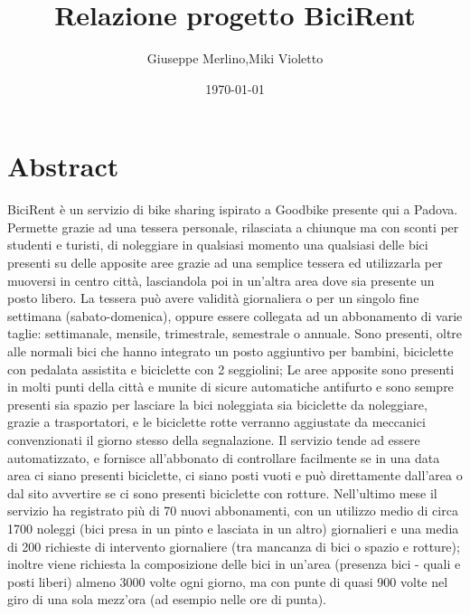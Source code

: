 \documentclass[a4paper,twoside]{article}
\author{Giuseppe Merlino,Miki Violetto}
\title{Relazione progetto BiciRent}
\date{\today}
\begin{document}
\maketitle

\newpage
\tableofcontents
\newpage


\section{Abstract}
BiciRent è un servizio di bike sharing ispirato a Goodbike presente qui a Padova.\newline
Permette grazie ad una tessera personale, rilasciata a chiunque ma con sconti per studenti e turisti, di noleggiare in qualsiasi momento una qualsiasi delle bici presenti su delle apposite aree grazie ad una semplice tessera ed utilizzarla per muoversi in centro città, lasciandola poi in un'altra area dove sia presente un posto libero.\newline
La tessera può avere validità giornaliera o per un singolo fine settimana (sabato-domenica), oppure essere collegata ad un abbonamento di varie taglie: settimanale, mensile, trimestrale, semestrale o  annuale.\newline
Sono presenti, oltre alle normali bici che hanno integrato un posto aggiuntivo per bambini, biciclette con pedalata assistita e biciclette con 2 seggiolini;\newline
Le aree apposite sono presenti in molti punti della città e munite di sicure automatiche antifurto e sono sempre presenti sia spazio per lasciare la bici noleggiata sia biciclette da noleggiare, grazie a trasportatori, e le biciclette rotte verranno aggiustate da meccanici convenzionati il giorno stesso della segnalazione.\newline
Il servizio tende ad essere automatizzato, e fornisce all'abbonato di controllare facilmente se in una data area ci siano presenti biciclette, ci siano posti vuoti e può direttamente dall'area o dal sito avvertire se ci sono presenti biciclette con rotture.\newline
Nell'ultimo mese il servizio ha registrato più di 70 nuovi abbonamenti, con un utilizzo medio di circa 1700 noleggi (bici presa in un pinto e lasciata in un altro) giornalieri e una media di 200 richieste di intervento giornaliere (tra mancanza di bici o spazio e rotture);\newline
inoltre viene richiesta la composizione delle bici in un'area (presenza bici - quali e posti liberi) almeno 3000 volte ogni giorno, ma con punte di quasi 900 volte nel giro di una sola mezz'ora (ad esempio nelle ore di punta).
\end{document}
